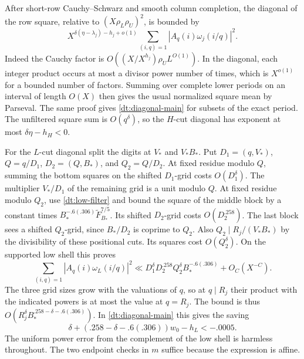 \documentclass[11pt,a4paper]{article}
\theoremstyle{paperplain}
\numberwithin{equation}{section}
\begin{document}
After short-row Cauchy--Schwarz and smooth column completion,
the diagonal of the row square, relative to
\((X\rho_L\rho_U)^2\), is bounded by
\begin{equation}\label{dt:diagonal-main}
 X^{\delta(\eta-\lambda_j)-h_j+o(1)}
       \sum_{(i,q)=1}|A_q(i)\omega_j(i/q)|^2 .
\end{equation}
Indeed the Cauchy factor is \(O((X/X^{h_j})\rho_U L^{O(1)})\).
In the diagonal, each integer product occurs at most a divisor
power number of times, which is \(X^{o(1)}\) for a bounded number
of factors. Summing over complete lower periods on an interval of
length \(O(X)\) then gives the usual normalized square mean by
Parseval. The same proof gives \eqref{dt:diagonal-main} for
subsets of the exact period. The unfiltered square sum
is \(O(q^\delta)\), so the \(H\)-cut diagonal has exponent
at most \(\delta\eta-h_H<0\).

For the \(L\)-cut diagonal split the digits at \(V_*\) and
\(V_*B_*\). Put \(D_1=(q,V_*)\), \(Q=q/D_1\), \(D_2=(Q,B_*)\),
and \(Q_2=Q/D_2\). At fixed residue modulo \(Q\), summing
the bottom squares on the shifted \(D_1\)-grid costs
\(O(D_1^\delta)\). The multiplier \(V_*/D_1\) of the
remaining grid is a unit modulo \(Q\).
At fixed residue modulo \(Q_2\), use \eqref{dt:low-filter} and
bound the square of the middle block by a constant times
\(B_*^{-.6(.306)}\widetilde F_{B_*}^{7/5}\).
Its shifted \(D_2\)-grid costs \(O(D_2^{.258})\).
The last block sees a shifted \(Q_2\)-grid, since \(B_*/D_2\)
is coprime to \(Q_2\). Also \(Q_2\mid R_j/(V_*B_*)\) by the
divisibility of these positional cuts. Its squares cost
\(O(Q_2^\delta)\). On the supported low shell this proves
\[
 \sum_{(i,q)=1}|A_q(i)\omega_L(i/q)|^2
   \ll D_1^\delta D_2^{.258} Q_2^\delta B_*^{-.6(.306)}
       +O_C(X^{-C}).
\]
The three grid sizes grow with the valuations of \(q\), so at
\(q\mid R_j\) their product with the indicated powers is at most
the value at \(q=R_j\). The bound is thus
\(O(R_j^\delta B_*^{.258-\delta-.6(.306)})\).
In \eqref{dt:diagonal-main} this gives the saving
\begin{equation}\label{dt:diagonal-saving}
 \delta+(.258-\delta-.6(.306))w_0-h_L<-.0005.
\end{equation}
The uniform power error from the complement of the low shell is
harmless throughout. The two endpoint checks in \(m\) suffice
because the expression is affine.
\end{document}
